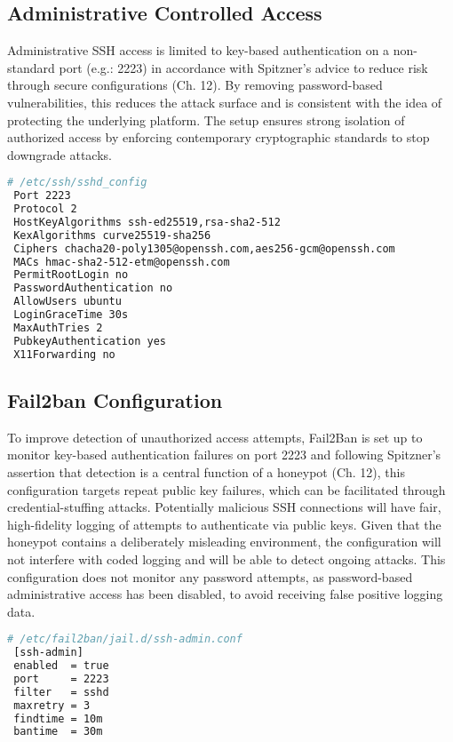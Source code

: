 \documentclass{cls/ULBreport}
\begin{document}
        \subsection{Administrative Controlled Access}
    Administrative SSH access is limited to key-based authentication on a non-standard port (e.g.: 2223) in accordance with Spitzner's advice to reduce risk through secure configurations (Ch. 12). By removing password-based vulnerabilities, this reduces the attack surface and is consistent with the idea of protecting the underlying platform. The setup ensures strong isolation of authorized access by enforcing contemporary cryptographic standards to stop downgrade attacks.        
        \begin{lstlisting}[language=bash,caption={Securing Legitimate Access}]
 # /etc/ssh/sshd_config
 Port 2223
 Protocol 2
 HostKeyAlgorithms ssh-ed25519,rsa-sha2-512
 KexAlgorithms curve25519-sha256
 Ciphers chacha20-poly1305@openssh.com,aes256-gcm@openssh.com
 MACs hmac-sha2-512-etm@openssh.com
 PermitRootLogin no
 PasswordAuthentication no
 AllowUsers ubuntu
 LoginGraceTime 30s
 MaxAuthTries 2
 PubkeyAuthentication yes
 X11Forwarding no
        \end{lstlisting}
        
        
        \subsection{Fail2ban Configuration} To improve detection of unauthorized access attempts, Fail2Ban is set up to monitor key-based authentication failures on port 2223 and following Spitzner's assertion that detection is a central function of a honeypot (Ch. 12), this configuration targets repeat public key failures, which can be facilitated through credential-stuffing attacks. Potentially malicious SSH connections will have fair, high-fidelity logging of attempts to authenticate via public keys. Given that the honeypot contains a deliberately misleading environment, the configuration will not interfere with coded logging and will be able to detect ongoing attacks. This configuration does not monitor any password attempts, as password-based administrative access has been disabled, to avoid receiving false positive logging data.
        
        \begin{lstlisting}[language=bash,caption={Custom Jail Rules}]
 # /etc/fail2ban/jail.d/ssh-admin.conf
 [ssh-admin]
 enabled  = true
 port     = 2223
 filter   = sshd
 maxretry = 3  
 findtime = 10m
 bantime  = 30m
        \end{lstlisting}
        
\end{document}
